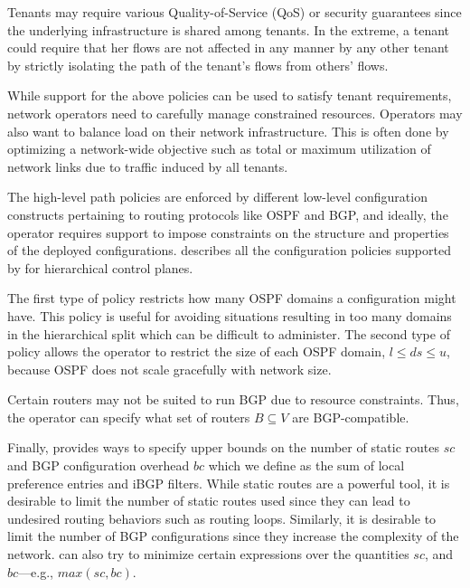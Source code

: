  Tenants may require various
Quality-of-Service (QoS) or security guarantees since the 
underlying infrastructure is shared among tenants. In the extreme, a
tenant could require that her flows are not affected in any manner
by any other tenant by strictly isolating the path of the tenant's
flows from others' flows. 

While support for the above policies can be used to satisfy tenant 
requirements, network operators need to 
carefully manage constrained resources. Operators may also want
to balance load on their network infrastructure. This is often done
by optimizing a network-wide objective such as total or maximum
utilization of network links due to traffic induced by all tenants. 

The high-level path policies are enforced by different low-level 
configuration constructs pertaining to routing protocols like OSPF and BGP, 
and ideally, the operator requires support to impose constraints on the structure 
and properties of the deployed configurations. 
describes all the configuration policies supported by \name for hierarchical 
control planes. 


The first type of policy restricts how many OSPF domains 
a configuration might have. This policy is useful for 
avoiding situations resulting in too
many domains in the hierarchical split which can be difficult to
administer. The second type of policy allows the operator to restrict
the size of each OSPF domain, $l\leq ds\leq u$, because OSPF does
not scale gracefully with network size.  

 Certain 
	routers may not be suited to run BGP due to resource
	constraints. Thus, the operator can specify what set of 
	routers $B\subseteq V$ are BGP-compatible. 
	

Finally, \name provides ways to specify upper bounds on the number of
static routes $sc$ and 
BGP configuration overhead $bc$ which we define as the 
sum of local preference entries and iBGP filters.
While static routes are a powerful tool, 
it is desirable to limit the number of static routes used since they
can lead to undesired routing behaviors such as routing loops.
Similarly, it is desirable to limit the number of BGP configurations
since they increase the complexity of the network.
\name can  also try to minimize 
certain expressions over the quantities $sc$, and $bc$---e.g., $max(sc, bc)$. 

